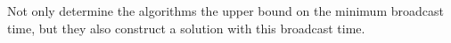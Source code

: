 Not only determine the algorithms the upper bound on the minimum broadcast time, but they also construct a solution with this broadcast time.

%
%
%
%
%

